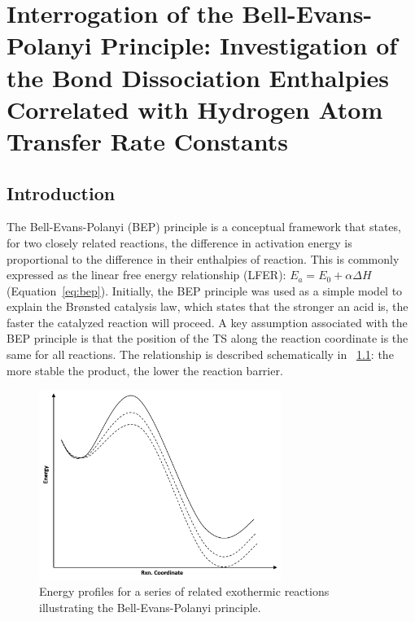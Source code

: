 
\chapter{Interrogation of the Bell-Evans-Polanyi Principle: Investigation of
the Bond Dissociation Enthalpies Correlated with Hydrogen Atom Transfer Rate
Constants} \label{ch:bde}

\begin{doublespace}
\section{Introduction}

The Bell-Evans-Polanyi (BEP) principle is a conceptual framework that states,
for two closely related reactions, the difference in activation energy is
proportional to the difference in their enthalpies of
reaction.\cite{Bell1936,Evans1938,Dill2003} This is commonly expressed as the
linear free energy relationship (LFER): $E_a = E_0 + \alpha \Delta H$
(Equation~\ref{eq:bep}). Initially, the BEP principle was used as a simple model
to explain the Br{\o}nsted catalysis law, which states that the stronger an acid
is, the faster the catalyzed reaction will proceed.\cite{Bronsted1924} A key
assumption associated with the BEP principle is that the position of the TS
along the reaction coordinate is the same for all reactions. The relationship is
described schematically in ~\ref{fig:bep}: the more stable the product, the
lower the reaction barrier.

\begin{figure}[!htbp]
  \centering
  \includegraphics[width=0.7\textwidth]{figures/bep}
  \caption{Energy profiles for a series of related exothermic reactions
  illustrating the Bell-Evans-Polanyi principle.} \label{fig:bep}
\end{figure}


\end{doublespace}
